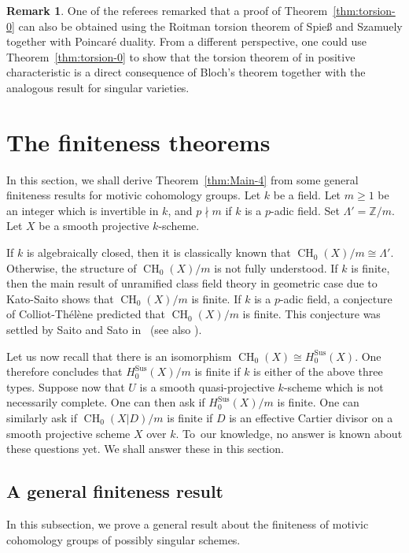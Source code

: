 \documentclass[JEP,XML,SOM,Unicode,published]{cedram}
\newcommand{\sus}{\mathrm{Sus}}
\theoremstyle{definition}
\newtheorem{remk}[thm]{Remark}
\newcommand{\thmref}{Theorem~\ref}
\newcommand{\Z}{{\mathbb Z}}
\DeclareMathOperator{\CH}{CH}
\begin{document}
\begin{remk}\label{remk:SS}
One of the referees remarked that a proof of \thmref{thm:torsion-0} can also be
obtained using the Roitman torsion theorem of Spie{\ss} and Szamuely \cite{SS} together with Poincaré duality.
From a different perspective, one could use \thmref{thm:torsion-0} to show that the torsion theorem
of \cite{SS} in positive characteristic is a direct consequence of
Bloch's theorem together with the analogous result for singular varieties.
\end{remk}

\section{The finiteness theorems}
\label{sec:Finiteness}
In this section, we shall derive \thmref{thm:Main-4} from
some general finiteness results for motivic cohomology groups.
Let $k$ be a field. Let $m \ge 1$ be an integer which is invertible in $k$,
and $p \nmid m$ if $k$ is a $p$-adic field. Set $\Lambda' = {\Z}/m$.
Let $X$ be a smooth projective $k$-scheme.

If $k$ is algebraically closed, then it is classically
known that ${\CH_0(X)}/m \cong \Lambda'$.
Otherwise, the structure of ${\CH_0(X)}/m$ is not fully understood.
If $k$ is finite, then the main result of unramified class field
theory in geometric case due to Kato-Saito \cite{Kato-Saito-1} shows that
${\CH_0(X)}/m$ is finite. If $k$ is a $p$-adic field, a conjecture of
Colliot-Thélène predicted that ${\CH_0(X)}/m$ is finite.
This conjecture was settled by Saito and Sato in~\cite{SaitoSatoAnnals}
(see also \cite[Prop.\,9.3]{EKW}).

Let us now recall that there is an isomorphism
${\CH_0(X)} \cong H^{\sus}_0(X)$. One therefore concludes that
${H^{\sus}_0(X)}/m$ is finite if $k$ is either of the above three types.
Suppose now that $U$ is a smooth quasi-projective $k$-scheme
which is not necessarily complete. One can then ask if
${H^{\sus}_0(X)}/m$ is finite. One can similarly ask
if ${\CH_0(X|D)}/m$ is finite if $D$ is an effective Cartier divisor on
a smooth projective scheme $X$ over $k$. To~our knowledge, no answer is known about
these questions yet. We shall answer these in this section.

\subsection{A general finiteness result}\label{sec:Fin-gen}
In this subsection, we prove a general result about the finiteness of motivic
cohomology groups of possibly singular schemes.
\end{document}
